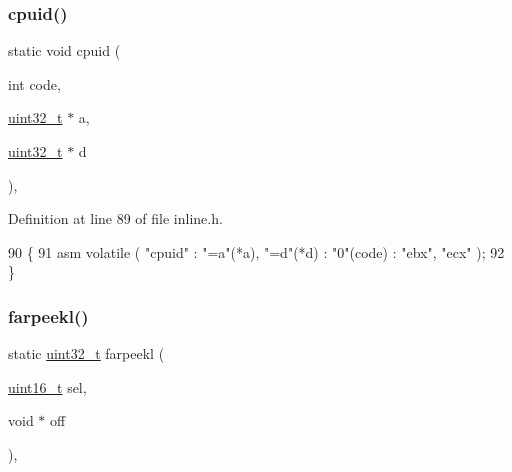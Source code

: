 \subsubsection{\texorpdfstring{cpuid()}{cpuid()}}
{\footnotesize\ttfamily static void cpuid (\begin{DoxyParamCaption}\item[{int}]{code,  }\item[{\hyperlink{a00104_a435d1572bf3f880d55459d9805097f62_a435d1572bf3f880d55459d9805097f62}{uint32\+\_\+t} $\ast$}]{a,  }\item[{\hyperlink{a00104_a435d1572bf3f880d55459d9805097f62_a435d1572bf3f880d55459d9805097f62}{uint32\+\_\+t} $\ast$}]{d }\end{DoxyParamCaption})\hspace{0.3cm}{\ttfamily [inline]}, {\ttfamily [static]}}



Definition at line 89 of file inline.\+h.


\begin{DoxyCode}
90 \{
91     \textcolor{keyword}{asm} \textcolor{keyword}{volatile} ( \textcolor{stringliteral}{"cpuid"} : \textcolor{stringliteral}{"=a"}(*a), \textcolor{stringliteral}{"=d"}(*d) : \textcolor{stringliteral}{"0"}(code) : \textcolor{stringliteral}{"ebx"}, \textcolor{stringliteral}{"ecx"} );
92 \}
\end{DoxyCode}
\mbox{\label{a00113_aee0779a0581136320f91a72c4d6b5b90_aee0779a0581136320f91a72c4d6b5b90}} 
\subsubsection{\texorpdfstring{farpeekl()}{farpeekl()}}
{\footnotesize\ttfamily static \hyperlink{a00104_a435d1572bf3f880d55459d9805097f62_a435d1572bf3f880d55459d9805097f62}{uint32\+\_\+t} farpeekl (\begin{DoxyParamCaption}\item[{\hyperlink{a00104_a273cf69d639a59973b6019625df33e30_a273cf69d639a59973b6019625df33e30}{uint16\+\_\+t}}]{sel,  }\item[{void $\ast$}]{off }\end{DoxyParamCaption})\hspace{0.3cm}{\ttfamily [inline]}, {\ttfamily [static]}}



